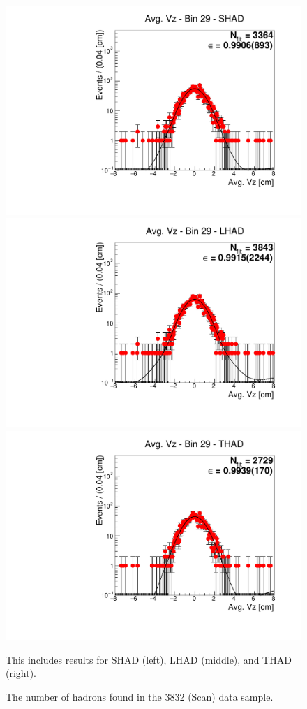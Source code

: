 \begin{figure}[H]
\centering
\includegraphics[scale=0.25]{figures/plots/nonDDbar_fit_results/scan/fit_scan_29_data_SHAD.pdf}
\hspace{-0.5cm}
\includegraphics[scale=0.25]{figures/plots/nonDDbar_fit_results/scan/fit_scan_29_data_LHAD.pdf}
\hspace{-0.5cm}
\includegraphics[scale=0.25]{figures/plots/nonDDbar_fit_results/scan/fit_scan_29_data_THAD.pdf}
\caption{The number of hadrons found in the 3832 (Scan) data sample.}
{This includes results for SHAD (left), LHAD (middle), and THAD (right).}
\label{fig:hadron_fits_scan_29}
\end{figure}


